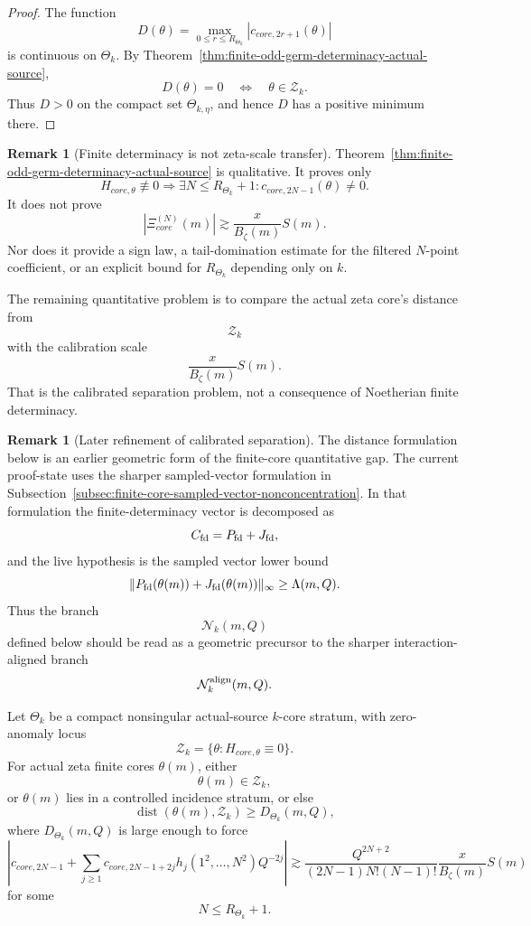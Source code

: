 \documentclass[11pt,a4paper]{amsart}
\def\core{core}%
\theoremstyle{plain}
\theoremstyle{definition}
\newtheorem{remark}[theorem]{Remark}
\newcommand{\core}{\mathrm{core}}
\begin{document}
\begin{proof}
The function
\[
D(\theta)
=
\max_{0\le r\le R_{\Theta_k}}
|c_{\core,2r+1}(\theta)|
\]
is continuous on \(\Theta_k\).  By
Theorem~\ref{thm:finite-odd-germ-determinacy-actual-source},
\[
D(\theta)=0
\quad\Longleftrightarrow\quad
\theta\in\mathcal Z_k.
\]
Thus \(D>0\) on the compact set \(\Theta_{k,\eta}\), and hence \(D\) has a
positive minimum there.
\end{proof}

\begin{remark}[Finite determinacy is not zeta-scale transfer]
\label{rem:finite-determinacy-not-zeta-scale-transfer}
Theorem~\ref{thm:finite-odd-germ-determinacy-actual-source} is qualitative.
It proves only
\[
H_{\core,\theta}\not\equiv0
\Longrightarrow
\exists N\le R_{\Theta_k}+1:
c_{\core,2N-1}(\theta)\ne0.
\]
It does not prove
\[
|\Xi_{\core}^{(N)}(m)|
\gtrsim
\frac{x}{B_\zeta(m)}S(m).
\]
Nor does it provide a sign law, a tail-domination estimate for the filtered
\(N\)-point coefficient, or an explicit bound for \(R_{\Theta_k}\) depending
only on \(k\).

The remaining quantitative problem is to compare the actual zeta core's
distance from
\[
\mathcal Z_k
\]
with the calibration scale
\[
\frac{x}{B_\zeta(m)}S(m).
\]
That is the calibrated separation problem, not a consequence of
Noetherian finite determinacy.
\end{remark}

\begin{remark}[Later refinement of calibrated separation]
\label{rem:calibrated-separation-later-refinement}
The distance formulation below is an earlier geometric form of the finite-core
quantitative gap.  The current proof-state uses the sharper sampled-vector
formulation in
Subsection~\ref{subsec:finite-core-sampled-vector-nonconcentration}.  In that
formulation the finite-determinacy vector is decomposed as
\[
C_{\rm fd}=P_{\rm fd}+J_{\rm fd},
\]
and the live hypothesis is the sampled vector lower bound
\[
\|P_{\rm fd}(\theta(m))+J_{\rm fd}(\theta(m))\|_\infty
\ge
\Lambda(m,Q).
\]
Thus the branch
\[
\mathcal N_k(m,Q)
\]
defined below should be read as a geometric precursor to the sharper
interaction-aligned branch
\[
\mathcal N_k^{\rm align}(m,Q).
\]
\end{remark}

\begin{hypothesis}
\label{hyp:calibrated-finite-core-separation}
Let \(\Theta_k\) be a compact nonsingular actual-source \(k\)-core stratum,
with zero-anomaly locus
\[
\mathcal Z_k
=
\{\theta:H_{\core,\theta}\equiv0\}.
\]
For actual zeta finite cores \(\theta(m)\), either
\[
\theta(m)\in\mathcal Z_k,
\]
or \(\theta(m)\) lies in a controlled incidence stratum, or else
\[
\operatorname{dist}(\theta(m),\mathcal Z_k)
\ge
D_{\Theta_k}(m,Q),
\]
where \(D_{\Theta_k}(m,Q)\) is large enough to force
\[
\left|
c_{\core,2N-1}
+
\sum_{j\ge1}
c_{\core,2N-1+2j}
h_j(1^2,\ldots,N^2)Q^{-2j}
\right|
\gtrsim
\frac{Q^{2N+2}}{(2N-1)N!(N-1)!}
\frac{x}{B_\zeta(m)}S(m)
\]
for some
\[
N\le R_{\Theta_k}+1.
\]
\end{hypothesis}
\end{document}
